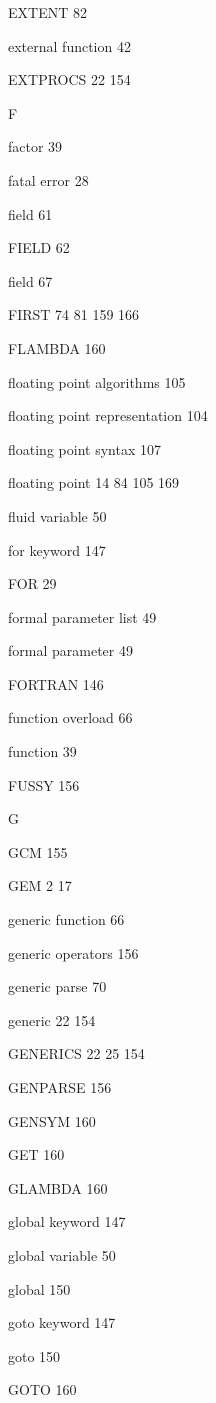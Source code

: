 \item EXTENT 82
\item external function 42
\item EXTPROCS  22 154
\indexspace
\item {\Large F}
\item factor 39
\item fatal error  28
\item field 61
\item FIELD 62
\item field 67
\item FIRST  74 81  159 166
\item FLAMBDA 160
\item floating point algorithms 105
\item floating point representation 104
\item floating point syntax 107
\item floating point  14 84 105 169
\item fluid variable 50
\item for keyword 147
\item FOR 29
\item formal parameter list 49
\item formal parameter 49
\item FORTRAN 146
\item function overload 66
\item function 39
\item FUSSY 156
\indexspace
\item {\Large G}
\item GCM 155
\item GEM  2 17
\item generic function 66
\item generic operators 156
\item generic parse 70
\item generic  22 154
\item GENERICS  22 25 154
\item GENPARSE 156
\item GENSYM 160
\item GET 160
\item GLAMBDA 160
\item global keyword 147
\item global variable 50
\item global 150
\item goto keyword  147
\item goto 150
\item GOTO  160

